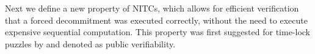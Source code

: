 %

Next we define a new property of NITCs, which allows for efficient verification that a forced decommitment was executed correctly, without the need to execute expensive sequential computation. This property was first suggested for time-lock puzzles by \cite{EPRINT:EFKP20a} and denoted as public verifiability.

